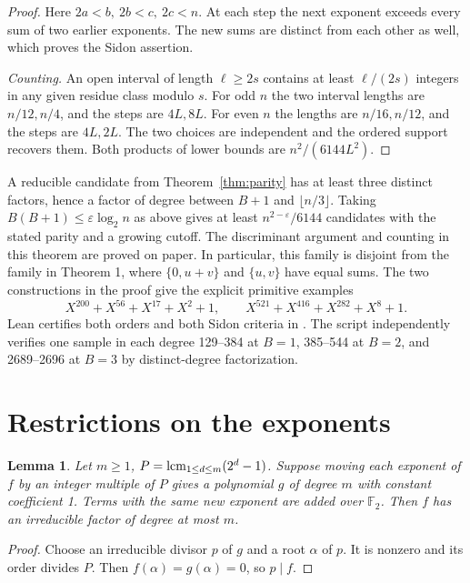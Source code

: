 \documentclass[11pt]{article}
\newtheorem{lemma}[theorem]{Lemma}
\newcommand{\F}{\mathbb F_2}
\begin{document}
\begin{proof}
Here \(2a<b,\ 2b<c,\ 2c<n\). At each step the next exponent exceeds
every sum of two earlier exponents. The new sums are distinct from
each other as well, which proves the Sidon assertion.

\emph{Counting.} An open interval of length \(\ell\ge2s\) contains at least
\(\ell/(2s)\) integers in any given residue class modulo \(s\).
For odd \(n\) the two interval lengths are \(n/12,n/4\), and the steps
are \(4L,8L\). For even \(n\) the lengths are \(n/16,n/12\), and the
steps are \(4L,2L\). The two choices are independent and the ordered
support recovers them. Both products of lower bounds are \(n^2/(6144L^2)\).
\end{proof}
A reducible candidate from Theorem~\ref{thm:parity} has at least three
distinct factors, hence a factor of degree between \(B+1\) and
\(\lfloor n/3\rfloor\). Taking \(B(B+1)\le\varepsilon\log_2 n\) as above
gives at least \(n^{2-\varepsilon}/6144\) candidates with the stated
parity and a growing cutoff. The discriminant argument and counting
in this theorem are proved on paper. In particular, this family is
disjoint from the family in Theorem 1, where \(\{0,u+v\}\) and
\(\{u,v\}\) have equal sums.
The two constructions in the proof give the explicit primitive examples
\[
 X^{200}+X^{56}+X^{17}+X^2+1,\qquad
 X^{521}+X^{416}+X^{282}+X^8+1.
\]
Lean certifies both orders and both Sidon criteria in
.
The script  independently verifies
one sample in each degree 129--384 at \(B=1\), 385--544 at \(B=2\), and
2689--2696 at \(B=3\) by distinct-degree factorization.

\section{Restrictions on the exponents}
\begin{lemma}\label{lem:compression}
Let \(m\ge1\), \(P=\mathop{\rm lcm}_{1\le d\le m}(2^d-1)\).
Suppose moving each exponent of \(f\) by an integer multiple of \(P\) gives a
polynomial \(g\) of degree \(m\) with constant coefficient 1. Terms with the
same new exponent are added over \(\F\).
Then \(f\) has an irreducible factor of degree at most \(m\).
\end{lemma}
\begin{proof}
Choose an irreducible divisor \(p\) of \(g\) and a root \(\alpha\) of \(p\).
It is nonzero and its order divides \(P\).
Then \(f(\alpha)=g(\alpha)=0\), so \(p\mid f\).
\end{proof}
\end{document}
